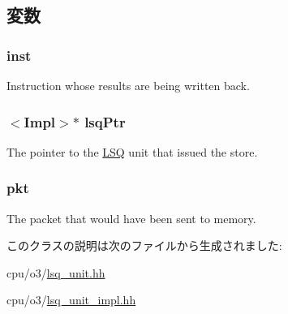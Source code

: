 \subsection{変数}
\hypertarget{classLSQUnit_1_1WritebackEvent_af5d4fb974eeb4507d4c837d365d0cefc}{
\subsubsection[{inst}]{ {\bf inst}}}
\label{classLSQUnit_1_1WritebackEvent_af5d4fb974eeb4507d4c837d365d0cefc}
Instruction whose results are being written back. \hypertarget{classLSQUnit_1_1WritebackEvent_a5b67c681be67b18b165082d08b8bc076}{
\subsubsection[{lsqPtr}]{$<$Impl$>$$\ast$ {\bf lsqPtr}}}
\label{classLSQUnit_1_1WritebackEvent_a5b67c681be67b18b165082d08b8bc076}
The pointer to the \hyperlink{classLSQ}{LSQ} unit that issued the store. \hypertarget{classLSQUnit_1_1WritebackEvent_a3a891bc2a0fcbe6be5297077d94e2df7}{
\subsubsection[{pkt}]{ {\bf pkt}}}
\label{classLSQUnit_1_1WritebackEvent_a3a891bc2a0fcbe6be5297077d94e2df7}
The packet that would have been sent to memory. 

このクラスの説明は次のファイルから生成されました:\begin{DoxyCompactItemize}
\item 
cpu/o3/\hyperlink{o3_2lsq__unit_8hh}{lsq\_\-unit.hh}\item 
cpu/o3/\hyperlink{o3_2lsq__unit__impl_8hh}{lsq\_\-unit\_\-impl.hh}\end{DoxyCompactItemize}
